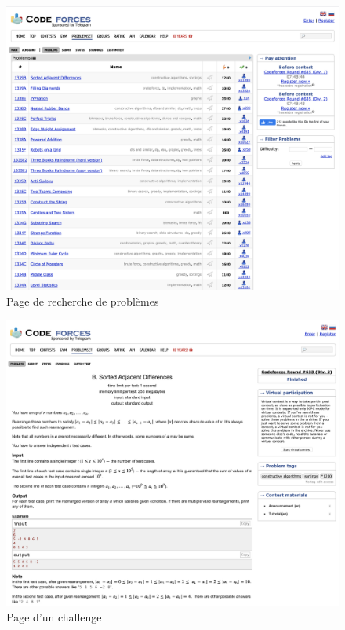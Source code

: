 \begin{figure}[H]
    \includegraphics[width=\textwidth,height=0.6\textheight,keepaspectratio]{images/comparison/codeforces-1.png}
    \centering
    \caption[Codeforces : page de recherche de problèmes]{Page de recherche de problèmes}
\end{figure}

\begin{figure}[H]
    \includegraphics[width=\textwidth,height=0.6\textheight,keepaspectratio]{images/comparison/codeforces-2.png}
    \centering
    \caption[Codeforces : page d'un challenge]{Page d'un challenge}
\end{figure}


